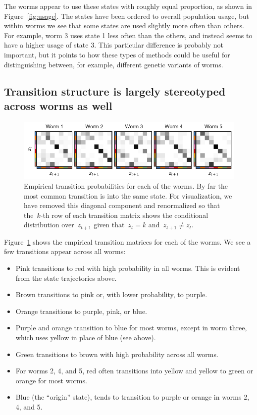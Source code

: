 \documentclass{article}
\begin{document}
The worms appear to use these states with roughly equal proportion,
as shown in Figure~\ref{fig:usage}.  The states have been ordered to
overall population usage, but within worms we see that some states
are used slightly more often than others.  For example, worm 3 uses
state 1 less often than the others, and instead seems to have a higher
usage of state 3.  This particular difference is probably not important, but it
points to how these types of methods could be useful for distinguishing
between, for example, different genetic variants of worms.

\clearpage

\subsection{Transition structure is largely stereotyped across worms as well}


\begin{figure}[h]
\centering
\includegraphics[width=5.5in]{figures/arhmm/trans_matrices.pdf}
\caption{Empirical transition probabilities for each of the worms.  By far
  the most common transition is into the same state.  For visualization, we
  have removed this diagonal component and renormalized so that the~$k$-th row of
  each transition matrix shows the conditional distribution over~$z_{t+1}$ given
  that~$z_{t}=k$ and~$z_{t+1} \neq z_t$. }
\label{fig:trans}
\end{figure}

Figure~\ref{fig:trans} shows the empirical transition matrices for each of the
worms.  We see a few transitions appear across all worms:
\begin{itemize}
\item Pink transitions to red with high probability in all worms. This is evident
  from the state trajectories above.
\item Brown transitions to pink or, with lower probability, to purple.
\item Orange transitions to purple, pink, or blue.
\item Purple and orange transition to blue for most worms, except in worm three,
  which uses yellow in place of blue (see above).
\item Green transitions to brown with high probability across all worms. 
\item For worms 2, 4, and 5, red often transitions into yellow and yellow to green or orange
  for most worms.
\item Blue (the ``origin'' state), tends to transition to purple or orange in
  worms 2, 4, and 5.
\end{itemize}
\end{document}
